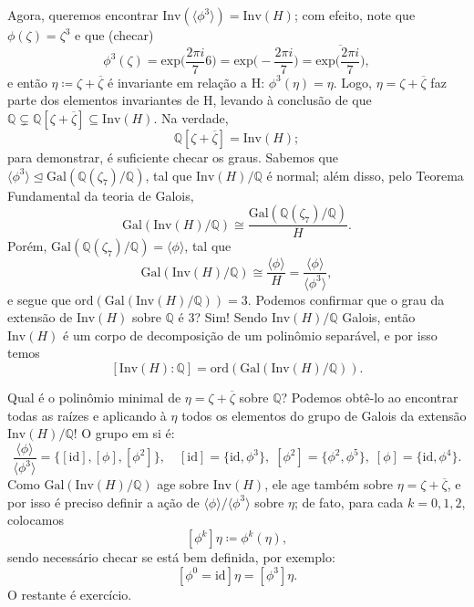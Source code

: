 \documentclass[../algebraIII_notes.tex]{subfiles}
\begin{document}
\begin{example}
	Agora, queremos encontrar \(\mathrm{Inv}(\langle \phi^{3} \rangle)=\mathrm{Inv}(H)\); com efeito, note que \(\phi(\zeta )=\zeta^{3}\) e que (checar)
	\[
		\phi^{3}(\zeta ) = \mathrm{exp}\biggl(\frac{2\pi i}{7}6\biggr) = \mathrm{exp}\biggl(-\frac{2\pi i}{7}\biggr) = \overline{\mathrm{exp}\biggl(\frac{2\pi i}{7}\biggr)},
	\]
	e então \(\eta \coloneqq \zeta + \overline{\zeta }\) é invariante em relação a H: \(\phi^{3}(\eta ) = \eta \). Logo, \(\eta =\zeta +\overline{\zeta }\) faz parte dos elementos invariantes de H, levando à conclusão de que \(\mathbb{Q}\subsetneq \mathbb{Q}[\zeta +\overline{\zeta } ] \subseteq \mathrm{Inv}(H)\). Na verdade,
	\[
		\mathbb{Q}[\zeta +\overline{\zeta }]=\mathrm{Inv}(H);
	\]
	para demonstrar, é suficiente checar os graus. Sabemos que \(\langle \phi^{3} \rangle \trianglelefteq \mathrm{Gal}(\mathbb{Q}(\zeta_{7})/\mathbb{Q})\), tal que \(\mathrm{Inv}(H)/\mathbb{Q}\) é normal; além disso, pelo Teorema Fundamental da teoria de Galois,
	\[
		\mathrm{Gal}(\mathrm{Inv}(H)/\mathbb{Q})\cong \frac{\mathrm{Gal}(\mathbb{Q}(\zeta_7)/\mathbb{Q})}{H}.
	\]
	Porém, \(\mathrm{Gal}(\mathbb{Q}(\zeta_7)/\mathbb{Q}) = \langle \phi  \rangle\), tal que
	\[
		\mathrm{Gal}(\mathrm{Inv}(H)/\mathbb{Q})\cong \frac{\langle \phi  \rangle}{H} = \frac{\langle \phi  \rangle}{\langle \phi^{3} \rangle},
	\]
	e segue que \(\mathrm{ord}(\mathrm{Gal}(\mathrm{Inv}(H)/\mathbb{Q}))=3\). Podemos confirmar que o grau da extensão de \(\mathrm{Inv}(H)\) sobre \(\mathbb{Q}\) é 3? Sim!
	Sendo \(\mathrm{Inv}(H)/\mathbb{Q}\) Galois, então \(\mathrm{Inv}(H)\) é um corpo de decomposição de um polinômio separável, e por isso temos
	\[
		[\mathrm{Inv}(H):\mathbb{Q}] = \mathrm{ord}(\mathrm{Gal}(\mathrm{Inv}(H)/\mathbb{Q})).
	\]

	Qual é o polinômio minimal de \(\eta = \zeta +\overline{\zeta }\) sobre \(\mathbb{Q}\)? Podemos obtê-lo ao encontrar todas as raízes e aplicando à \(\eta \) todos os elementos do grupo de Galois da extensão \(\mathrm{Inv}(H)/\mathbb{Q}\)! O grupo em si é:
	\[
		\frac{\langle \phi  \rangle}{\langle \phi^{3} \rangle} = \{[\mathrm{id}], [\phi ], [\phi^{2}]\}, \quad [\mathrm{id}]=\{\mathrm{id}, \phi^{3}\},\; [\phi^{2}]=\{\phi^{2}, \phi^{5}\},\; [\phi ]=\{\mathrm{id}, \phi^{4}\}.
	\]
	Como \(\mathrm{Gal}(\mathrm{Inv}(H)/\mathbb{Q})\) age sobre \(\mathrm{Inv}(H)\), ele age também sobre \(\eta = \zeta +\overline{\zeta }\), e por isso é preciso definir a ação de \(\langle \phi  \rangle/ \langle \phi^{3} \rangle\) sobre \(\eta \); de fato, para cada \(k=0, 1, 2\), colocamos
	\[
		[\phi^{k}]\eta  \coloneqq \phi^{k}(\eta ),
	\]
	sendo necessário checar se está bem definida, por exemplo:
	\[
		[\phi^{0}=\mathrm{id}]\eta =[\phi^{3}]\eta.
	\]
	O restante é exercício.


\end{example}
\end{document}
